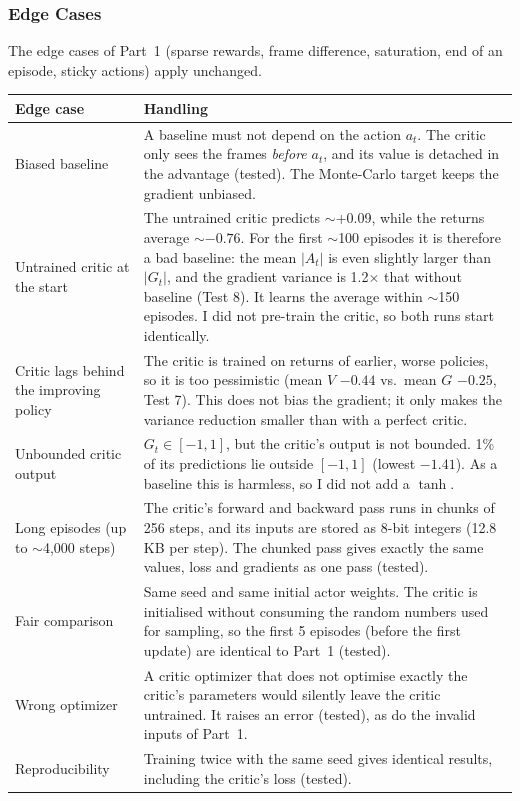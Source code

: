 \subsubsection{Edge Cases}

The edge cases of Part~1 (sparse rewards, frame difference, saturation, end of an episode, sticky actions) apply unchanged.

\begin{center}
\small
\begin{tabularx}{\textwidth}{@{}p{3.6cm}L@{}}
  \toprule
  \textbf{Edge case} & \textbf{Handling} \\
  \midrule
  Biased baseline & A baseline must not depend on the action $a_t$. The critic only sees the frames \emph{before} $a_t$, and its value is detached in the advantage (tested). The Monte-Carlo target keeps the gradient unbiased. \\
  Untrained critic at the start & The untrained critic predicts $\sim$+0.09, while the returns average $\sim$$-0.76$. For the first $\sim$100 episodes it is therefore a bad baseline: the mean $|A_t|$ is even slightly larger than $|G_t|$, and the gradient variance is 1.2$\times$ that without baseline (Test 8). It learns the average within $\sim$150 episodes. I did not pre-train the critic, so both runs start identically. \\
  Critic lags behind the improving policy & The critic is trained on returns of earlier, worse policies, so it is too pessimistic (mean $V$ $-0.44$ vs.\ mean $G$ $-0.25$, Test 7). This does not bias the gradient; it only makes the variance reduction smaller than with a perfect critic. \\
  Unbounded critic output & $G_t \in [-1, 1]$, but the critic's output is not bounded. 1\% of its predictions lie outside $[-1, 1]$ (lowest $-1.41$). As a baseline this is harmless, so I did not add a $\tanh$. \\
  Long episodes (up to $\sim$4,000 steps) & The critic's forward and backward pass runs in chunks of 256 steps, and its inputs are stored as 8-bit integers (12.8\,KB per step). The chunked pass gives exactly the same values, loss and gradients as one pass (tested). \\
  Fair comparison & Same seed and same initial actor weights. The critic is initialised without consuming the random numbers used for sampling, so the first 5 episodes (before the first update) are identical to Part~1 (tested). \\
  Wrong optimizer & A critic optimizer that does not optimise exactly the critic's parameters would silently leave the critic untrained. It raises an error (tested), as do the invalid inputs of Part~1. \\
  Reproducibility & Training twice with the same seed gives identical results, including the critic's loss (tested). \\
  \bottomrule
\end{tabularx}
\end{center}

